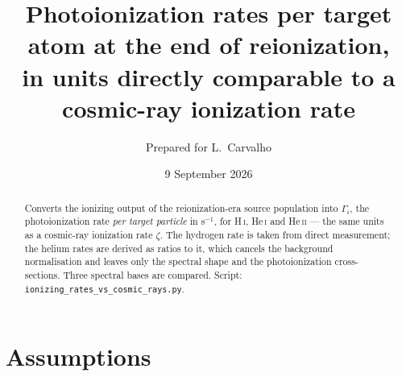 \documentclass[11pt,a4paper]{article}
\title{\bf Photoionization rates per target atom at the end of reionization,\\
in units directly comparable to a cosmic-ray ionization rate}
\author{Prepared for L.\ Carvalho}
\date{9 September 2026}
\begin{document}
\maketitle

\begin{abstract}
\noindent
Converts the ionizing output of the reionization-era source population into
$\Gamma_i$, the photoionization rate \emph{per target particle} in s$^{-1}$,
for H\,\textsc{i}, He\,\textsc{i} and He\,\textsc{ii} --- the same units as a
cosmic-ray ionization rate $\zeta$.  The hydrogen rate is taken from direct
measurement; the helium rates are derived as ratios to it, which cancels the
background normalisation and leaves only the spectral shape and the
photoionization cross-sections.  Three spectral bases are compared.
Script: \texttt{ionizing\_rates\_vs\_cosmic\_rays.py}.
\end{abstract}

\section{Assumptions}
\end{document}
